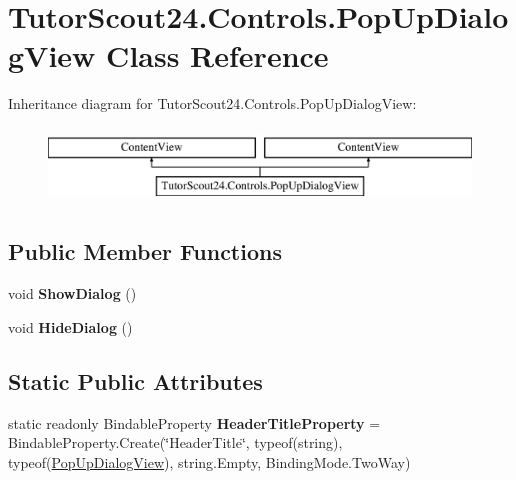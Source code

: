\hypertarget{class_tutor_scout24_1_1_controls_1_1_pop_up_dialog_view}{}\section{Tutor\+Scout24.\+Controls.\+Pop\+Up\+Dialog\+View Class Reference}
\label{class_tutor_scout24_1_1_controls_1_1_pop_up_dialog_view}
Inheritance diagram for Tutor\+Scout24.\+Controls.\+Pop\+Up\+Dialog\+View\+:\begin{figure}[H]
\begin{center}
\leavevmode
\includegraphics[height=2.000000cm]{class_tutor_scout24_1_1_controls_1_1_pop_up_dialog_view}
\end{center}
\end{figure}
\subsection*{Public Member Functions}
\begin{DoxyCompactItemize}
\item 
\mbox{\label{class_tutor_scout24_1_1_controls_1_1_pop_up_dialog_view_a87d4908794e4fc24e1a254c6bffcdd0c}} 
void {\bfseries Show\+Dialog} ()
\item 
\mbox{\label{class_tutor_scout24_1_1_controls_1_1_pop_up_dialog_view_adb39d66a6f12dbe7bd79c9067d3c14c3}} 
void {\bfseries Hide\+Dialog} ()
\end{DoxyCompactItemize}
\subsection*{Static Public Attributes}
\begin{DoxyCompactItemize}
\item 
\mbox{\label{class_tutor_scout24_1_1_controls_1_1_pop_up_dialog_view_adbd1069e6d6fa90ab7bc788304782f79}} 
static readonly Bindable\+Property {\bfseries Header\+Title\+Property} = Bindable\+Property.\+Create(\char`\"{}Header\+Title\char`\"{}, typeof(string), typeof(\mbox{\hyperlink{class_tutor_scout24_1_1_controls_1_1_pop_up_dialog_view}{Pop\+Up\+Dialog\+View}}), string.\+Empty, Binding\+Mode.\+Two\+Way)
\end{DoxyCompactItemize}
